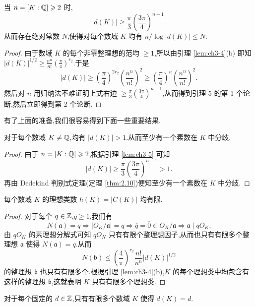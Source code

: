\begin{lemma}\label{lem:ch3-5}
当 $n=[K:\mathbb{Q}]\geqslant 2$ 时,
\[
  |d(K)|\geqslant\frac{\pi}{3}\left(\frac{3\pi}{4}\right)^{n-1}.
\]
从而存在绝对常数 $N$,使得对每个数域 $K$ 均有 $n/\log|d(K)|\leqslant N$.
\end{lemma}

\begin{proof}
由于数域 $K$ 的每个非零整理想的范均 $\geqslant 1$,所以由引理 \ref{lem:ch3-4}(b) 即知 $|d(K)|^{1/2}\geqslant\frac{n^n}{n!}\left(\frac{\pi}{4}\right)^{r_2}$.于是
\[
  |d(K)|\geqslant\left(\frac{\pi}{4}\right)^{2r_2}\left(\frac{n^n}{n!}\right)^2
  \geqslant\left(\frac{\pi}{4}\right)^n\left(\frac{n^n}{n!}\right)^2.
\]
然后对 $n$ 用归纳法不难证明上式右边 $\geqslant\frac{\pi}{3}\left(\frac{3\pi}{4}\right)^{n-1}$,从而得到引理 5 的第 1 个论断,然后立即得到第 2 个论断.
\end{proof}

有了上面的准备,我们很容易得到下面一些重要结果.

\begin{theorem}\label{thm:3.3}
对于每个数域 $K\neq\mathbb{Q}$,均有 $|d(K)|>1$.从而至少有一个素数在 $K$ 中分歧.
\end{theorem}

\begin{proof}
由于 $n=[K:\mathbb{Q}]\geqslant 2$,根据引理 \ref{lem:ch3-5} 可知
\[
  |d(K)|\geqslant\frac{\pi}{3}\left(\frac{3\pi}{4}\right)^{n-1}>1.
\]
再由 Dedekind 判别式定理(定理 \ref{thm:2.10})便知至少有一个素数在 $K$ 中分歧.
\end{proof}

\begin{theorem}\label{thm:3.4}
每个数域 $K$ 的理想类数 $h(K)=|C(K)|$ 均有限.
\end{theorem}

\begin{proof}
对于每个 $q\in\mathbb{Z}$,$q\geqslant 1$,我们有
\[
  N(\mathfrak{a})=q\Rightarrow|O_K/\mathfrak{a}|=q\Rightarrow\overline{q}=\overline{0}\in O_K/\mathfrak{a}\Rightarrow\mathfrak{a}\mid qO_K.
\]
由 $qO_K$ 的素理想分解式可知 $qO_K$ 只有有限个整理想因子,从而也只有有限多个整理想 $\mathfrak{a}$ 使得 $N(\mathfrak{a})=q$.从而
\[
  N(\mathfrak{b})\leqslant\left(\frac{4}{\pi}\right)^{r_2}\frac{n!}{n^n}|d(K)|^{1/2}
\]
的整理想 $\mathfrak{b}$ 也只有有限多个.根据引理 \ref{lem:ch3-4}(b),$K$ 的每个理想类中均包含有这样的整理想 $\mathfrak{b}$,这就表明 $K$ 只有有限多个理想类.
\end{proof}

\begin{theorem}\label{thm:3.5}
对于每个固定的 $d\in\mathbb{Z}$,只有有限多个数域 $K$ 使得 $d(K)=d$.
\end{theorem}

